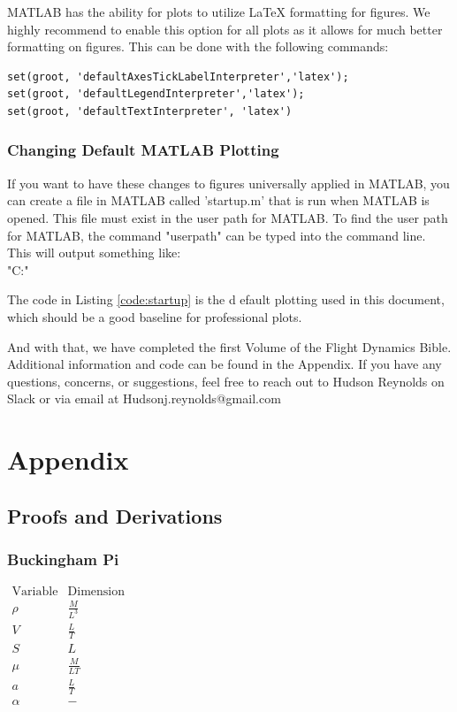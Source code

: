 \documentclass[12pt]{report}
\begin{document}
MATLAB has the ability for plots to utilize LaTeX formatting for figures. We highly recommend to enable this option for all plots as it allows for much better formatting on figures. This can be done with the following commands:
\begin{lstlisting}[style=Matlab-editor]
set(groot, 'defaultAxesTickLabelInterpreter','latex');
set(groot, 'defaultLegendInterpreter','latex');
set(groot, 'defaultTextInterpreter', 'latex')
\end{lstlisting}
\subsection{Changing Default MATLAB Plotting}
If you want to have these changes to figures universally applied in MATLAB, you can create a file in MATLAB called 'startup.m' that is run when MATLAB is opened. This file must exist in the user path for MATLAB. To find the user path for MATLAB, the command "userpath" can be typed into the command line. This will output something like:
\\
"C:\Users\YourName\OneDrive\Documents\MATLAB"

The code in Listing \ref{code:startup} is the d efault plotting used in this document, which should be a good baseline for professional plots.
\label{code:startup}

And with that, we have completed the first Volume of the Flight Dynamics Bible. Additional information and code can be found in the Appendix. If you have any questions, concerns, or suggestions, feel free to reach out to Hudson Reynolds on Slack or via email at Hudsonj.reynolds@gmail.com


\chapter{Appendix}

\section{Proofs and Derivations}\label{sec:ProofsAndDerivations}
\subsection{Buckingham Pi}\label{Buckingham Pi Deriv}

\begin{center}
$\begin{array}{ccc}
     \text{Variable} & \text{Dimension}
     &  \\ \rho & \frac{M}{L^3}
     &  \\ V    & \frac{L}{T}
     &  \\ S    & L
     &  \\\mu &  \frac{M}{LT}
     &  \\a & \frac{L}{T}
     & \\\alpha & -
\end{array}$
\end{center}
\end{document}
